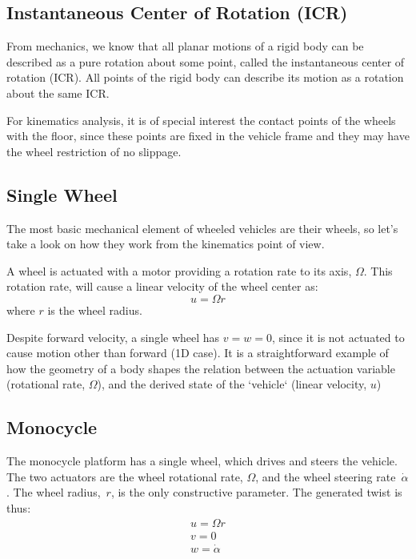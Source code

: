 \subsection{Instantaneous Center of Rotation (ICR)}
From mechanics, we know that all planar motions of a rigid body can be described as a pure rotation about some point, called the instantaneous center of rotation (ICR). All points of the rigid body can describe its motion as a rotation about the same ICR. 

For kinematics analysis, it is of special interest the contact points of the wheels with the floor, since these points are fixed in the vehicle frame and they may have the wheel restriction of no slippage. 


\subsection{Single Wheel}
The most basic mechanical element of wheeled vehicles are their wheels, so let's take a look on how they work from the kinematics point of view.

A wheel is actuated with a motor providing a rotation rate to its axis, $\Omega$. This rotation rate, will cause a linear velocity of the wheel center as: 
\begin{equation}
 u = \Omega r
\end{equation}
where $r$ is the wheel radius. 

Despite forward velocity, a single wheel has $v = w = 0$, since it is not actuated to cause motion other than forward (1D case). It is a straightforward example of how the geometry of a body shapes the relation between the actuation variable (rotational rate, $\Omega$), and the derived state of the `vehicle` (linear velocity, $u$)

\subsection{Monocycle}
The monocycle platform has a single wheel, which drives and steers the vehicle. The two actuators are the wheel rotational rate, $\Omega$, and the wheel steering rate~$\dot{\alpha}$. The wheel radius,~$r$, is the only constructive parameter. The generated twist is thus: 
\begin{align}
u = \Omega r \\
v = 0 \\
w = \dot{\alpha}
\end{align} 


